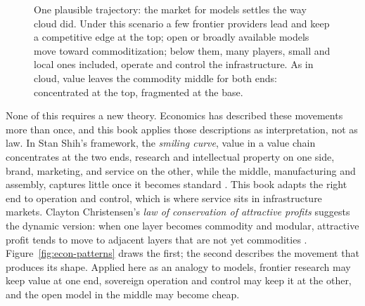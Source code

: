 \documentclass[10pt,oneside,openany]{book}
\begin{document}
\begin{figure}[!htbp]
{}
\caption{One plausible trajectory: the market for models settles the way cloud did. Under this scenario a few frontier providers lead and keep a competitive edge at the top; open or broadly available models move toward commoditization; below them, many players, small and local ones included, operate and control the infrastructure. As in cloud, value leaves the commodity middle for both ends: concentrated at the top, fragmented at the base.}
\label{fig:model-market}
\end{figure}

None of this requires a new theory. Economics has described these movements more than once, and this book applies those descriptions as interpretation, not as law. In Stan Shih's framework, the \emph{smiling curve}, value in a value chain concentrates at the two ends, research and intellectual property on one side, brand, marketing, and service on the other, while the middle, manufacturing and assembly, captures little once it becomes standard \cite{shih1996}. This book adapts the right end to operation and control, which is where service sits in infrastructure markets. Clayton Christensen's \emph{law of conservation of attractive profits} suggests the dynamic version: when one layer becomes commodity and modular, attractive profit tends to move to adjacent layers that are not yet commodities \cite{christensen2003}. Figure~\ref{fig:econ-patterns} draws the first; the second describes the movement that produces its shape. Applied here as an analogy to models, frontier research may keep value at one end, sovereign operation and control may keep it at the other, and the open model in the middle may become cheap.
\end{document}
